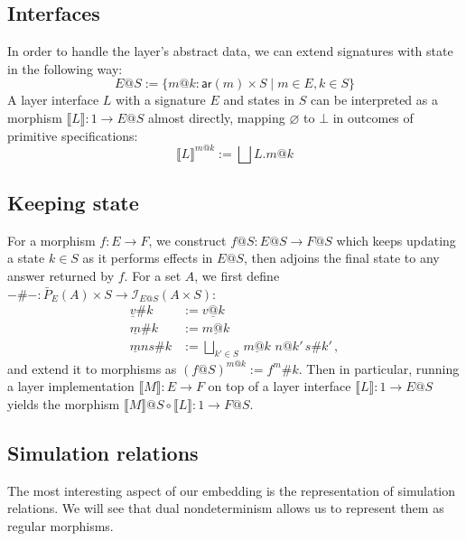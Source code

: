 \documentclass[draft,11pt]{report}
\theoremstyle{definition}
\newcommand{\kw}[1]{\ensuremath{ \mathsf{#1} }}
\begin{document}

\subsection{Interfaces} %

In order to handle the layer's abstract data,
we can extend signatures with state in the following way:
\[
  E@S :=
    \{ m@k : \kw{ar}(m) \times S \mid
       m \in E, k \in S \}
\]
A layer interface $L$ with a signature $E$
and states in $S$
can be interpreted as
a morphism $\llbracket L \rrbracket : 1 \rightarrow E@S$
almost directly,
mapping $\varnothing$ to $\bot$
in outcomes of primitive specifications:
\[
  \llbracket L \rrbracket^{m@k} :=
    \bigsqcup L.m@k
\]


\subsection{Keeping state} %

For a morphism $f : E \rightarrow F$,
we construct $f@S : E@S \rightarrow F@S$
which keeps updating a state $k \in S$
as it performs effects in $E@S$,
then adjoins the final state to any answer
returned by $f$.
For a set $A$, we first define
$-\#- : \bar{P}_E(A) \times S \rightarrow \mathcal{I}_{E@S}(A \times S)$:
\begin{align*}
  \underline{v}\#k &:= \underline{v@k} \\
  \underline{m}\#k &:= \underline{m@k} \\
  \underline{m}ns\#k &:=
    \bigsqcup_{k' \in S} \, \underline{m@k} \,\, n@k' \, s\#k' \,,
\end{align*}
and extend it to morphisms as $(f@S)^{m@k} := f^m\#k$.
Then in particular,
running a layer implementation
$\llbracket M \rrbracket : E \rightarrow F$
on top of a layer interface
$\llbracket L \rrbracket : 1 \rightarrow E@S$
yields the morphism
$\llbracket M \rrbracket @ S \circ \llbracket L \rrbracket :
 1 \rightarrow F@S$.


\subsection{Simulation relations} %

The most interesting aspect of our embedding
is the representation of simulation relations.
We will see that dual nondeterminism
allows us to represent them as regular morphisms.
\end{document}

